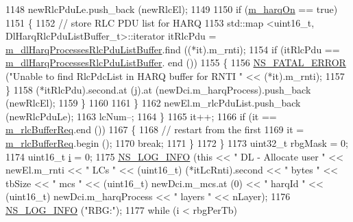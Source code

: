 \begin{DoxyCode}
1148                   newRlcPduLe.push\_back (newRlcEl);
1149 
1150                   \textcolor{keywordflow}{if} (\hyperlink{classns3_1_1RrFfMacScheduler_aa57694b4b80d2dc907f1e5281d3defab}{m\_harqOn} == \textcolor{keyword}{true})
1151                     \{
1152                       \textcolor{comment}{// store RLC PDU list for HARQ}
1153                       std::map <uint16\_t, DlHarqRlcPduListBuffer\_t>::iterator itRlcPdu =  
      \hyperlink{classns3_1_1RrFfMacScheduler_a2a6afd0a7df7a71c20382176f6cc9573}{m\_dlHarqProcessesRlcPduListBuffer}.find ((*it).m\_rnti);
1154                       \textcolor{keywordflow}{if} (itRlcPdu == \hyperlink{classns3_1_1RrFfMacScheduler_a2a6afd0a7df7a71c20382176f6cc9573}{m\_dlHarqProcessesRlcPduListBuffer}.
      end ())
1155                         \{
1156                           \hyperlink{group__fatal_ga5131d5e3f75d7d4cbfd706ac456fdc85}{NS\_FATAL\_ERROR} (\textcolor{stringliteral}{"Unable to find RlcPdcList in HARQ buffer for RNTI 
      "} << (*it).m\_rnti);
1157                         \}
1158                       (*itRlcPdu).second.at (j).at (newDci.m\_harqProcess).push\_back (newRlcEl);
1159                     \}
1160 
1161                 \}
1162               newEl.m\_rlcPduList.push\_back (newRlcPduLe);
1163               lcNum--;
1164             \}
1165           it++;
1166           \textcolor{keywordflow}{if} (it == \hyperlink{classns3_1_1RrFfMacScheduler_a25a4bfbb928e22dc026209de004b90fd}{m\_rlcBufferReq}.end ())
1167             \{
1168               \textcolor{comment}{// restart from the first}
1169               it = \hyperlink{classns3_1_1RrFfMacScheduler_a25a4bfbb928e22dc026209de004b90fd}{m\_rlcBufferReq}.begin ();
1170               \textcolor{keywordflow}{break};
1171             \}
1172         \}
1173       uint32\_t rbgMask = 0;
1174       uint16\_t \hyperlink{bernuolliDistribution_8m_a6f6ccfcf58b31cb6412107d9d5281426}{i} = 0;
1175       \hyperlink{group__logging_gafbd73ee2cf9f26b319f49086d8e860fb}{NS\_LOG\_INFO} (\textcolor{keyword}{this} << \textcolor{stringliteral}{" DL - Allocate user "} << newEl.m\_rnti << \textcolor{stringliteral}{" LCs "} << (uint16\_t)
      (*itLcRnti).second << \textcolor{stringliteral}{" bytes "} << tbSize << \textcolor{stringliteral}{" mcs "} << (uint16\_t) newDci.m\_mcs.at (0) << \textcolor{stringliteral}{" harqId "} << (uint16\_t)
      newDci.m\_harqProcess <<  \textcolor{stringliteral}{" layers "} << nLayer);
1176       \hyperlink{group__logging_gafbd73ee2cf9f26b319f49086d8e860fb}{NS\_LOG\_INFO} (\textcolor{stringliteral}{"RBG:"});
1177       \textcolor{keywordflow}{while} (i < rbgPerTb)

\end{DoxyCode}
